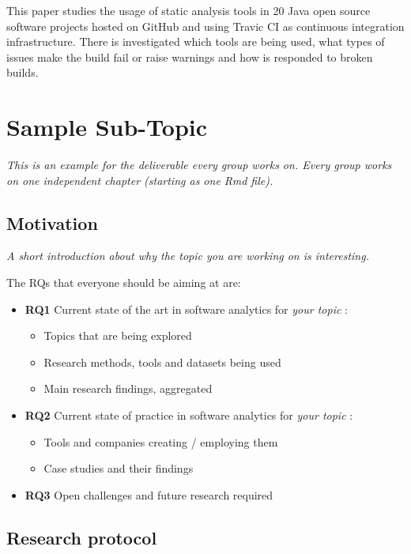 \documentclass[]{book}
\providecommand{\tightlist}{%
  \setlength{\itemsep}{0pt}\setlength{\parskip}{0pt}}
\begin{document}
This paper studies the usage of static analysis tools in 20 Java open
source software projects hosted on GitHub and using Travic CI as
continuous integration infrastructure. There is investigated which tools
are being used, what types of issues make the build fail or raise
warnings and how is responded to broken builds.

\chapter{Sample Sub-Topic}\label{sample-sub-topic}

\emph{This is an example for the deliverable every group works on. Every
group works on one independent chapter (starting as one Rmd file).}

\section{Motivation}\label{motivation}

\emph{A short introduction about why the topic you are working on is
interesting.}

The RQs that everyone should be aiming at are:

\begin{itemize}
\tightlist
\item
  \textbf{RQ1} Current state of the art in software analytics for
  \emph{your topic }:

  \begin{itemize}
  \tightlist
  \item
    Topics that are being explored
  \item
    Research methods, tools and datasets being used
  \item
    Main research findings, aggregated
  \end{itemize}
\item
  \textbf{RQ2} Current state of practice in software analytics for
  \emph{your topic }:

  \begin{itemize}
  \tightlist
  \item
    Tools and companies creating / employing them
  \item
    Case studies and their findings
  \end{itemize}
\item
  \textbf{RQ3} Open challenges and future research required
\end{itemize}

\section{Research protocol}\label{research-protocol}
\end{document}
